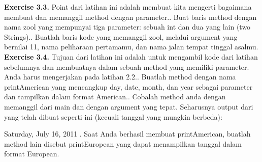 \textbf{Exercise 3.3.} Point dari latihan ini adalah membuat kita mengerti bagaimana membuat dan memanggil method dengan parameter.\newline {}.	Buat baris method dengan nama zool yang mempunyai tiga parameter: sebuah int dan dua yang lain (two Strings).\newline {}.	Buatlah baris kode yang memanggil zool, melalui argument yang bernilai 11, nama peliharaan pertamamu, dan nama jalan tempat tinggal asalmu.\newline \newline
\textbf{Exercise 3.4.} Tujuan dari latihan ini adalah untuk mengambil kode dari latihan sebelumnya dan membuatnya dalam sebuah method yang memiliki parameter. Anda harus mengerjakan pada latihan 2.2.\newline {}.	Buatlah method dengan nama printAmerican yang mencangkup day, date, month, dan year sebagai parameter dan tampilkan dalam format American.\newline {}.	Cobalah method anda dengan memanggil dari main dan dengan argument yang tepat. Seharusnya output dari yang telah dibuat seperti ini (kecuali tanggal yang mungkin berbeda):\newline

Saturday, July 16, 2011 \newline {}.	Saat Anda berhasil membuat printAmerican, buatlah method lain disebut printEuropean yang dapat menampilkan tanggal dalam format European.